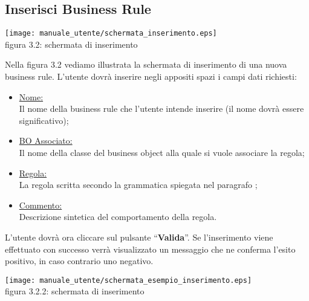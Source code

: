 \subsection{Inserisci Business Rule}
\begin{center}
\texttt{[image: manuale\_utente/schermata\_inserimento.eps]}\\
 figura 3.2: schermata di inserimento
\end{center}
Nella figura 3.2 vediamo illustrata la schermata di inserimento di una nuova business rule. L'utente dovr\`a inserire negli appositi spazi i campi dati richiesti:
\begin{itemize}
\item \underline{Nome:} \\
Il nome della business rule che l'utente intende inserire (il nome dovr\`a essere significativo);
\item \underline{BO Associato:} \\
Il nome della classe del business object alla quale si vuole associare la regola;
\item \underline{Regola:} \\
 La regola scritta secondo la grammatica spiegata nel paragrafo \Grammatica;
\item \underline{Commento:} \\
Descrizione sintetica del comportamento della regola. 
\end{itemize}
L'utente dovr\`a ora cliccare sul pulsante ``\textbf{Valida}''. Se l'inserimento viene effettuato con successo verr\`a visualizzato un messaggio che ne conferma l'esito positivo, in caso contrario uno negativo. 
\begin{center}
\texttt{[image: manuale\_utente/schermata\_esempio\_inserimento.eps]}\\
 figura 3.2.2: schermata di inserimento
\end{center} %
